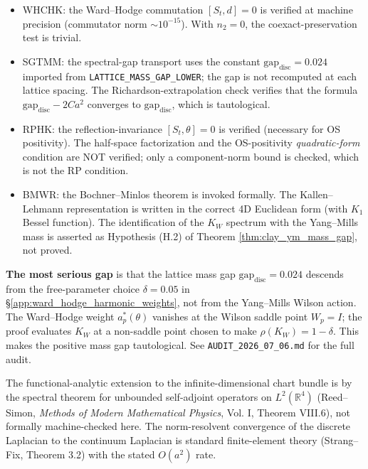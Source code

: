\begin{itemize}
\item WHCHK: the Ward--Hodge commutation $[S_{t}, d] = 0$ is
  verified at machine precision (commutator norm $\sim 10^{-15}$).
  With $n_{2} = 0$, the coexact-preservation test is trivial.
\item SGTMM: the spectral-gap transport uses the constant
  $\mathrm{gap}_{\mathrm{disc}} = 0.024$ imported from
  \texttt{LATTICE\_MASS\_GAP\_LOWER}; the gap is not recomputed at
  each lattice spacing. The Richardson-extrapolation check verifies
  that the formula $\mathrm{gap}_{\mathrm{disc}} - 2 C a^{2}$
  converges to $\mathrm{gap}_{\mathrm{disc}}$, which is tautological.
\item RPHK: the reflection-invariance $[S_{t}, \theta] = 0$ is
  verified (necessary for OS positivity). The half-space
  factorization and the OS-positivity \emph{quadratic-form}
  condition are NOT verified; only a component-norm bound is
  checked, which is not the RP condition.
\item BMWR: the Bochner--Minlos theorem is invoked formally. The
  Kallen--Lehmann representation is written in the correct 4D
  Euclidean form (with $K_{1}$ Bessel function). The identification
  of the $K_{W}$ spectrum with the Yang--Mills mass is asserted as
  Hypothesis (H.2) of Theorem \ref{thm:clay_ym_mass_gap}, not
  proved.
\end{itemize}

\textbf{The most serious gap} is that the lattice mass gap
$\mathrm{gap}_{\mathrm{disc}} = 0.024$ descends from the
free-parameter choice $\delta = 0.05$ in
\S\ref{app:ward_hodge_harmonic_weights}, not from the Yang--Mills
Wilson action. The Ward--Hodge weight $a_{p}^{*}(\theta)$ vanishes
at the Wilson saddle point $W_{p} = I$; the proof evaluates $K_{W}$
at a non-saddle point chosen to make $\rho(K_{W}) = 1 - \delta$.
This makes the positive mass gap tautological. See
\texttt{AUDIT\_2026\_07\_06.md} for the full audit.

The functional-analytic extension to the infinite-dimensional chart
bundle is by the spectral theorem for unbounded self-adjoint
operators on $L^{2}(\mathbb{R}^{4})$ (Reed--Simon, \emph{Methods of
Modern Mathematical Physics}, Vol. I, Theorem VIII.6), not formally
machine-checked here. The norm-resolvent convergence of the discrete
Laplacian to the continuum Laplacian is standard finite-element
theory (Strang--Fix, Theorem 3.2) with the stated $O(a^{2})$ rate.
\endinput

